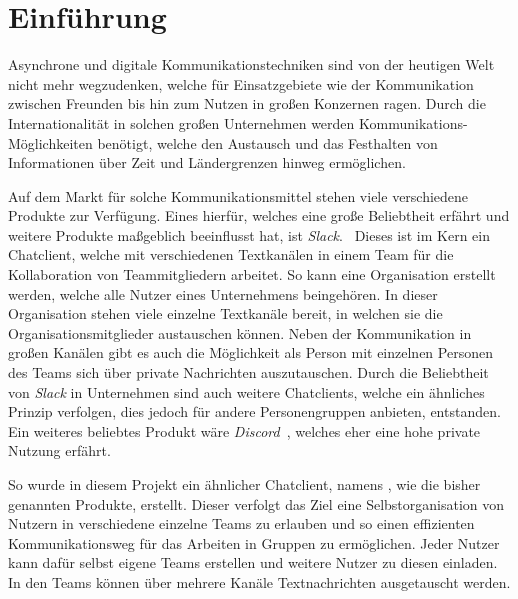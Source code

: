 \chapter{Einführung}

Asynchrone und digitale Kommunikationstechniken sind von der heutigen Welt nicht
mehr wegzudenken, welche für Einsatzgebiete wie der Kommunikation zwischen Freunden
bis hin zum Nutzen in großen Konzernen ragen. Durch die Internationalität in solchen
großen Unternehmen werden Kommunikations-Möglichkeiten benötigt, welche den Austausch
und das Festhalten von Informationen über Zeit und Ländergrenzen hinweg ermöglichen.

Auf dem Markt für solche Kommunikationsmittel stehen viele verschiedene Produkte
zur Verfügung. Eines hierfür, welches eine große Beliebtheit erfährt und weitere
Produkte maßgeblich beeinflusst hat, ist \emph{Slack}.~\cite{slack} Dieses ist
im Kern ein Chatclient, welche mit verschiedenen Textkanälen in einem Team für
die Kollaboration von Teammitgliedern arbeitet. So kann eine Organisation erstellt werden,
welche alle Nutzer eines Unternehmens beingehören. In dieser Organisation stehen viele einzelne Textkanäle bereit,
in welchen sie die Organisationsmitglieder austauschen können. Neben der Kommunikation in großen Kanälen
gibt es auch die Möglichkeit als Person mit einzelnen Personen des Teams sich über
private Nachrichten auszutauschen. Durch die Beliebtheit von \emph{Slack} in Unternehmen sind
auch weitere Chatclients, welche ein ähnliches Prinzip verfolgen, dies jedoch für andere Personengruppen anbieten, entstanden.
Ein weiteres beliebtes Produkt wäre \emph{Discord}~\cite{discord}, welches eher eine hohe private Nutzung erfährt.

So wurde in diesem Projekt ein ähnlicher Chatclient, namens , wie die bisher
genannten Produkte, erstellt. Dieser verfolgt das Ziel eine Selbstorganisation von Nutzern
in verschiedene einzelne Teams zu erlauben und so einen effizienten Kommunikationsweg
für \zb{} das Arbeiten in Gruppen zu ermöglichen. Jeder Nutzer kann dafür selbst eigene
Teams erstellen und weitere Nutzer zu diesen einladen. In den Teams können über mehrere Kanäle
Textnachrichten ausgetauscht werden.
